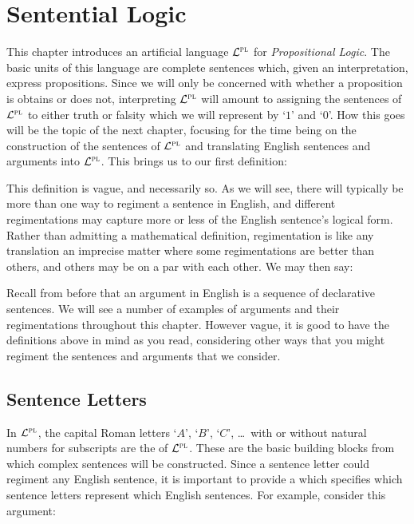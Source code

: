 \chapter{Sentential Logic}
  \label{ch.PL-syntax}




This chapter introduces an artificial language $\mathcal{L}^{\textsc{pl}}$ for \textit{Propositional Logic}.
The basic units of this language are complete sentences which, given an interpretation, express propositions.
Since we will only be concerned with whether a proposition is obtains or does not, interpreting $\mathcal{L}^{\textsc{pl}}$ will amount to assigning the sentences of $\mathcal{L}^{\textsc{pl}}$ to either truth or falsity which we will represent by `$1$' and `$0$'.
How this goes will be the topic of the next chapter, focusing for the time being on the construction of the sentences of $\mathcal{L}^{\textsc{pl}}$ and translating English sentences and arguments into $\mathcal{L}^{\textsc{pl}}$.
This brings us to our first definition: 
  

This definition is vague, and necessarily so.
As we will see, there will typically be more than one way to regiment a sentence in English, and different regimentations may capture more or less of the English sentence's logical form.
Rather than admitting a mathematical definition, regimentation is like any translation an imprecise matter where some regimentations are better than others, and others may be on a par with each other.
We may then say:


Recall from before that an argument in English is a sequence of declarative sentences.
We will see a number of examples of arguments and their regimentations throughout this chapter.
However vague, it is good to have the definitions above in mind as you read, considering other ways that you might regiment the sentences and arguments that we consider.




\section{Sentence Letters}

In $\mathcal{L}^{\textsc{pl}}$, the capital Roman letters `$A$', `$B$', `$C$', \ldots\ with or without natural numbers for subscripts are the  of $\mathcal{L}^{\textsc{pl}}$.
These are the basic building blocks from which complex sentences will be constructed.
Since a sentence letter could regiment any English sentence, it is important to provide a  which specifies which sentence letters represent which English sentences.
For example, consider this argument:

